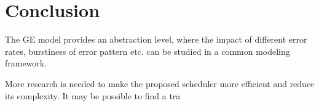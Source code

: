 \chapter{Conclusion}

The GE model provides an abstraction level, where the impact of different error
rates, burstiness of error pattern etc. can be studied in a common modeling
framework.

More research is needed to make the proposed scheduler more efficient and reduce
its complexity. 
It may be possible to find a tra
